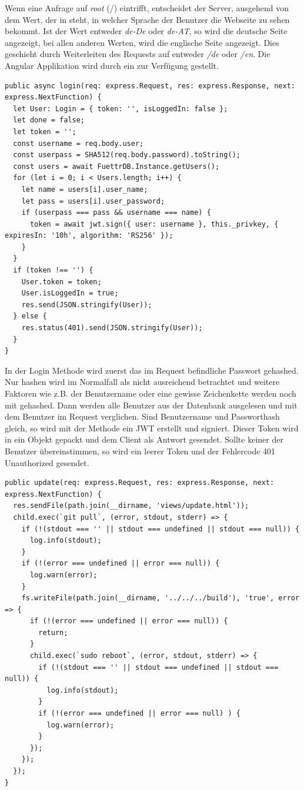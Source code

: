 Wenn eine Anfrage auf \textit{root} (/) eintrifft, entscheidet der Server, ausgehend von dem Wert, der in  steht, in welcher Sprache der Benutzer die Webseite zu sehen bekommt. Ist der Wert entweder \textit{de-De} oder \textit{de-AT}, so wird die deutsche Seite angezeigt, bei allen anderen Werten, wird die englische Seite angezeigt. Dies geschieht durch Weiterleiten des Requests auf entweder \textit{/de} oder \textit{/en}. Die Angular Applikation wird durch ein  zur Verfügung gestellt.

\begin{lstlisting}[style=TS,caption=Login Methode,label=login]
public async login(req: express.Request, res: express.Response, next: express.NextFunction) {
  let User: Login = { token: '', isLoggedIn: false };
  let done = false;
  let token = '';
  const username = req.body.user;
  const userpass = SHA512(req.body.password).toString();
  const users = await FuettrDB.Instance.getUsers();
  for (let i = 0; i < Users.length; i++) {
    let name = users[i].user_name;
    let pass = users[i].user_password;
    if (userpass === pass && username === name) {
      token = await jwt.sign({ user: username }, this._privkey, { expiresIn: '10h', algorithm: 'RS256' });
    }
  }
  if (token !== '') {
    User.token = token;
    User.isLoggedIn = true;
    res.send(JSON.stringify(User));
  } else {
    res.status(401).send(JSON.stringify(User));
  }
}
\end{lstlisting}

In der Login Methode wird zuerst das im Request befindliche Passwort gehashed. Nur hashen wird im Normalfall als nicht ausreichend betrachtet und weitere Faktoren wie z.B. der Benutzername oder eine gewisse Zeichenkette werden noch mit gehashed. Dann werden alle Benutzer aus der Datenbank ausgelesen und mit dem Benutzer im Request verglichen. Sind Benutzername und Passworthash gleich, so wird mit der Methode  ein \ac{JWT} erstellt und signiert. Dieser Token wird in ein Objekt gepackt und dem Client als Antwort gesendet. Sollte keiner der Benutzer übereinstimmen, so wird ein leerer Token und der Fehlercode 401 Unauthorized gesendet.

\begin{lstlisting}[caption=Update Methode,label=update methode,style=TS]
public update(req: express.Request, res: express.Response, next: express.NextFunction) {
  res.sendFile(path.join(__dirname, 'views/update.html'));
  child.exec(`git pull`, (error, stdout, stderr) => {
    if (!(stdout === '' || stdout === undefined || stdout === null)) {
      log.info(stdout);
    }
    if (!(error === undefined || error === null)) {
      log.warn(error);
    }
    fs.writeFile(path.join(__dirname, '../../../build'), 'true', error => {
      if (!(error === undefined || error === null)) {
        return;
      }
      child.exec(`sudo reboot`, (error, stdout, stderr) => {
        if (!(stdout === '' || stdout === undefined || stdout === null)) {
          log.info(stdout);
        }
        if (!(error === undefined || error === null) ) {
          log.warn(error);
        }
      });
    });
  });
}
\end{lstlisting}

